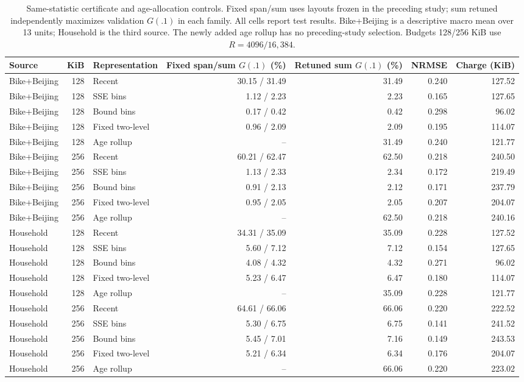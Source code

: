 \begin{table}[t]\centering\small
\caption{Same-statistic certificate and age-allocation controls. Fixed span/sum uses layouts frozen in the preceding study; sum retuned independently maximizes validation $G(.1)$ in each family. All cells report test results. Bike+Beijing is a descriptive macro mean over 13 units; Household is the third source. The newly added age rollup has no preceding-study selection. Budgets 128/256 KiB use $R=4096/16{,}384$.}\label{tab:certage}
\begin{tabular}{@{}lrlrrrr@{}}\toprule
Source & KiB & Representation & Fixed span/sum $G(.1)$ (\%) & Retuned sum $G(.1)$ (\%) & NRMSE & Charge (KiB)\\\midrule
Bike+Beijing & 128 & Recent & 30.15 / 31.49 & 31.49 & 0.240 & 127.52\\
Bike+Beijing & 128 & SSE bins & 1.12 / 2.23 & 2.23 & 0.165 & 127.65\\
Bike+Beijing & 128 & Bound bins & 0.17 / 0.42 & 0.42 & 0.298 & 96.02\\
Bike+Beijing & 128 & Fixed two-level & 0.96 / 2.09 & 2.09 & 0.195 & 114.07\\
Bike+Beijing & 128 & Age rollup & -- & 31.49 & 0.240 & 121.77\\
Bike+Beijing & 256 & Recent & 60.21 / 62.47 & 62.50 & 0.218 & 240.50\\
Bike+Beijing & 256 & SSE bins & 1.13 / 2.33 & 2.34 & 0.172 & 219.49\\
Bike+Beijing & 256 & Bound bins & 0.91 / 2.13 & 2.12 & 0.171 & 237.79\\
Bike+Beijing & 256 & Fixed two-level & 0.95 / 2.05 & 2.05 & 0.207 & 204.07\\
Bike+Beijing & 256 & Age rollup & -- & 62.50 & 0.218 & 240.16\\
Household & 128 & Recent & 34.31 / 35.09 & 35.09 & 0.228 & 127.52\\
Household & 128 & SSE bins & 5.60 / 7.12 & 7.12 & 0.154 & 127.65\\
Household & 128 & Bound bins & 4.08 / 4.32 & 4.32 & 0.271 & 96.02\\
Household & 128 & Fixed two-level & 5.23 / 6.47 & 6.47 & 0.180 & 114.07\\
Household & 128 & Age rollup & -- & 35.09 & 0.228 & 121.77\\
Household & 256 & Recent & 64.61 / 66.06 & 66.06 & 0.220 & 222.52\\
Household & 256 & SSE bins & 5.30 / 6.75 & 6.75 & 0.141 & 241.52\\
Household & 256 & Bound bins & 5.45 / 7.01 & 7.16 & 0.149 & 243.53\\
Household & 256 & Fixed two-level & 5.21 / 6.34 & 6.34 & 0.176 & 204.07\\
Household & 256 & Age rollup & -- & 66.06 & 0.220 & 223.02\\
\bottomrule\end{tabular}\end{table}
